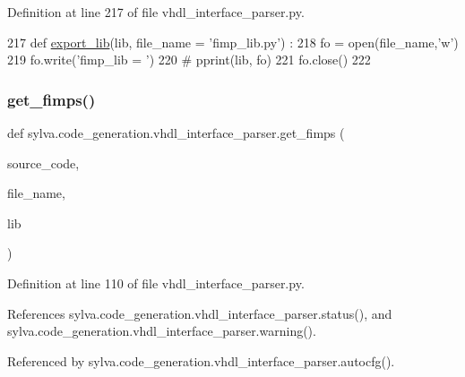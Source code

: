 Definition at line 217 of file vhdl\+\_\+interface\+\_\+parser.\+py.


\begin{DoxyCode}
217 \textcolor{keyword}{def }\hyperlink{namespacesylva_1_1code__generation_1_1vhdl__interface__parser_af7576699c6ef184fb26f0988bd9ab795}{export\_lib}(lib, file\_name = 'fimp\_lib.py') :
218   fo = open(file\_name,\textcolor{stringliteral}{'w'})
219   fo.write(\textcolor{stringliteral}{'fimp\_lib = '})
220   \textcolor{comment}{# pprint(lib, fo)}
221   fo.close()
222 
\end{DoxyCode}
\mbox{\label{namespacesylva_1_1code__generation_1_1vhdl__interface__parser_a58e8d5a1d080f5c440889bddbbbb514a}} 
\subsubsection{\texorpdfstring{get\+\_\+fimps()}{get\_fimps()}}
{\footnotesize\ttfamily def sylva.\+code\+\_\+generation.\+vhdl\+\_\+interface\+\_\+parser.\+get\+\_\+fimps (\begin{DoxyParamCaption}\item[{}]{source\+\_\+code,  }\item[{}]{file\+\_\+name,  }\item[{}]{lib }\end{DoxyParamCaption})}



Definition at line 110 of file vhdl\+\_\+interface\+\_\+parser.\+py.



References sylva.\+code\+\_\+generation.\+vhdl\+\_\+interface\+\_\+parser.\+status(), and sylva.\+code\+\_\+generation.\+vhdl\+\_\+interface\+\_\+parser.\+warning().



Referenced by sylva.\+code\+\_\+generation.\+vhdl\+\_\+interface\+\_\+parser.\+autocfg().


